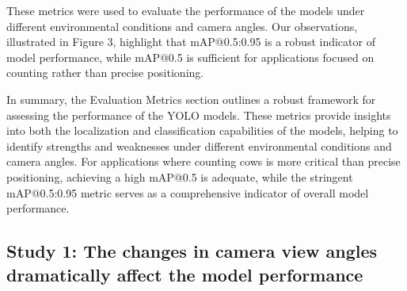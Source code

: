 These metrics were used to evaluate the performance of the models under different environmental conditions and camera angles. Our observations, illustrated in Figure 3, highlight that mAP@0.5:0.95 is a robust indicator of model performance, while mAP@0.5 is sufficient for applications focused on counting rather than precise positioning.

In summary, the Evaluation Metrics section outlines a robust framework for assessing the performance of the YOLO models. These metrics provide insights into both the localization and classification capabilities of the models, helping to identify strengths and weaknesses under different environmental conditions and camera angles. For applications where counting cows is more critical than precise positioning, achieving a high mAP@0.5 is adequate, while the stringent mAP@0.5:0.95 metric serves as a comprehensive indicator of overall model performance.





\subsection*{Study 1: The changes in camera view angles dramatically affect the model performance}




